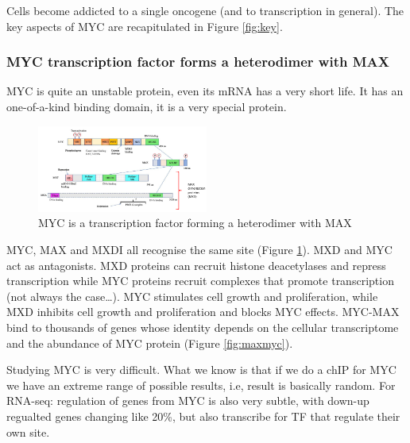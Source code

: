Cells become addicted to a single oncogene (and to transcription in general). The key aspects of MYC are recapitulated in Figure \ref{fig:key}.

\hypertarget{myc-transcription-factor-forms-a-heterodimer-with-max}{%
\subsubsection{MYC transcription factor forms a heterodimer with MAX}\label{myc-transcription-factor-forms-a-heterodimer-with-max}}

MYC is quite an unstable protein, even its mRNA has a very short life. It has an one-of-a-kind binding domain, it is a very special protein.

\begin{figure}
\centering
\includegraphics[width=0.5\textwidth]{../_resources/01adbb32a69ee3baec1bf9bddd890f52.png}
\caption{ MYC is a transcription factor forming a heterodimer with MAX}
\label{fig:myc}
\end{figure}

MYC, MAX and MXDI all recognise the same site (Figure \ref{fig:myc}).
MXD and MYC act as antagonists. MXD proteins can recruit histone deacetylases and repress transcription while MYC proteins recruit complexes that promote transcription (not always the case\ldots). MYC stimulates cell growth and proliferation, while MXD inhibits cell growth and proliferation and blocks MYC effects.
MYC-MAX bind to thousands of genes whose identity depends on the cellular transcriptome and the abundance of MYC protein (Figure \ref{fig:maxmyc}).


Studying MYC is very difficult. What we know is that if we do a chIP for MYC we have an extreme range of possible results, i.e, result is basically random. For RNA-seq: regulation of genes from MYC is also very subtle, with down-up regualted genes changing like 20\%, but also transcribe for TF that regulate their own site.

